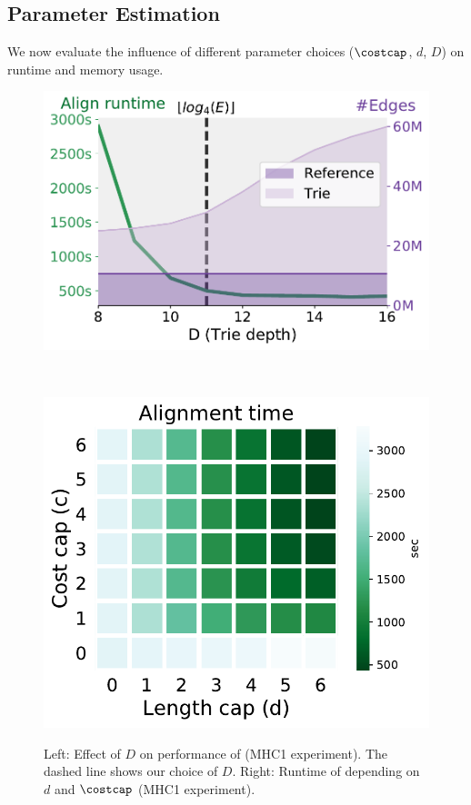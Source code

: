 \subsection{Parameter Estimation} \label{TRIEsubsec:parameter_estimation}
We now evaluate the influence of different parameter choices ($\costcap$, $d$,
$D$) on runtime and memory usage.

\begin{figure}[b]
	\centering
	\begin{minipage}{0.48\linewidth}
		\centering
		\includegraphics[width=\linewidth]{figs/trie/MHC1-trie-vs-D.pdf}
		\caption{Left: Effect of $D$ on performance of \astarix (MHC1 experiment). The dashed line shows our choice of $D$. Right: Runtime of \astarix depending on $d$ and $\costcap$ (MHC1 experiment).}
		\label{TRIEfig:trie_vs_D}
	\end{minipage}~\hspace{0.7em}
	\begin{minipage}{0.49\linewidth}
		\centering
		\includegraphics[width=0.8\linewidth]{figs/heuristic/MHC1-heatmap-c_vs_d-align_sec.pdf}
		\label{TRIEfig:heuristic-parameters}
	\end{minipage}
\end{figure}

